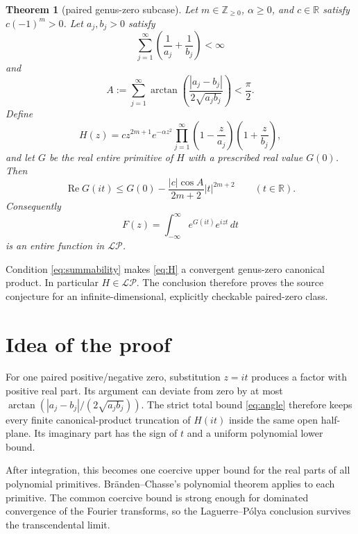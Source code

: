 \documentclass[11pt]{article}
\newtheorem{theorem}{Theorem}
\newcommand{\LP}{\mathcal{L}\!\mathcal{P}}
\begin{document}
\begin{theorem}[paired genus-zero subcase]\label{thm:main}
Let $m\in\mathbb{Z}_{\ge0}$, $\alpha\ge0$, and $c\in\mathbb{R}$ satisfy
$c(-1)^m>0$.  Let $a_j,b_j>0$ satisfy
\begin{equation}\label{eq:summability}
 \sum_{j=1}^{\infty}\left(\frac1{a_j}+\frac1{b_j}\right)<\infty
\end{equation}
and
\begin{equation}\label{eq:angle}
 A:=\sum_{j=1}^{\infty}
 \arctan\!\left(\frac{|a_j-b_j|}{2\sqrt{a_jb_j}}\right)<\frac{\pi}{2}.
\end{equation}
Define
\begin{equation}\label{eq:H}
 H(z)=c z^{2m+1}e^{-\alpha z^2}
 \prod_{j=1}^{\infty}\left(1-\frac{z}{a_j}\right)
                         \left(1+\frac{z}{b_j}\right),
\end{equation}
and let $G$ be the real entire primitive of $H$ with a prescribed real value
$G(0)$.  Then
\begin{equation}\label{eq:coercive}
 \operatorname{Re}G(it)
 \le G(0)-\frac{|c|\cos A}{2m+2}|t|^{2m+2}
 \qquad(t\in\mathbb{R}).
\end{equation}
Consequently
\[
 F(z)=\int_{-\infty}^{\infty}e^{G(it)}e^{izt}\,dt
\]
is an entire function in $\LP$.
\end{theorem}

Condition \eqref{eq:summability} makes \eqref{eq:H} a convergent genus-zero
canonical product.  In particular $H\in\LP$.  The conclusion therefore proves
the source conjecture for an infinite-dimensional, explicitly checkable
paired-zero class.

\section{Idea of the proof}

For one paired positive/negative zero, substitution $z=it$ produces a factor
with positive real part.  Its argument can deviate from zero by at most
$\arctan(|a_j-b_j|/(2\sqrt{a_jb_j}))$.  The strict total bound
\eqref{eq:angle} therefore keeps every finite canonical-product truncation of
$H(it)$ inside the same open half-plane.  Its imaginary part has the sign of
$t$ and a uniform polynomial lower bound.

After integration, this becomes one coercive upper bound for the real parts of
all polynomial primitives.  Br\"anden--Chasse's polynomial theorem applies to
each primitive.  The common coercive bound is strong enough for dominated
convergence of the Fourier transforms, so the Laguerre--P\'olya conclusion
survives the transcendental limit.
\end{document}
